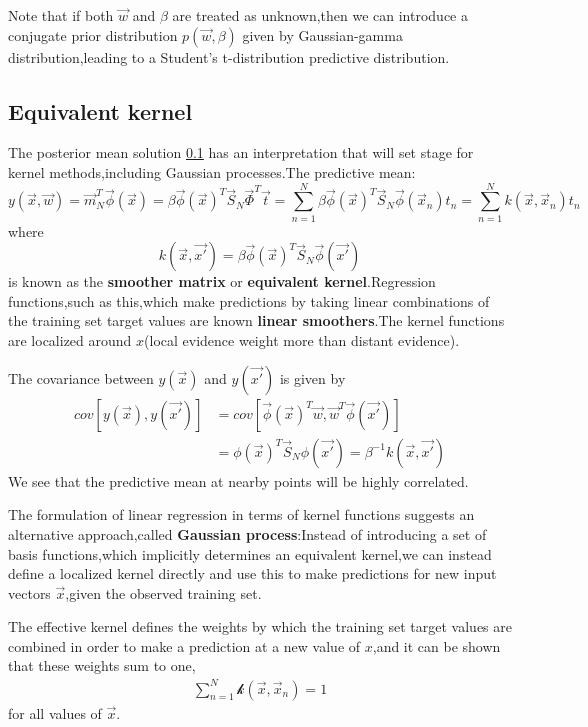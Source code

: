Note that if both $\vec{w}$ and $\beta$ are treated as unknown,then we can introduce a conjugate prior distribution $p(\vec{w},\beta)$ given by Gaussian-gamma distribution,leading to a Student's t-distribution predictive distribution.

\subsection{Equivalent kernel}
The posterior mean solution \ref{} has an interpretation that will set stage for kernel methods,including Gaussian processes.The predictive mean:
\begin{equation}
y(\vec{x},\vec{w})=\vec{m}_N^T\vec{\phi}(\vec{x})
=\beta\vec{\phi}(\vec{x})^T\vec{S}_N\vec{\Phi}^T\vec{t}
=\sum_{n=1}^{N}\beta\vec{\phi}(\vec{x})^T\vec{S}_N\vec{\phi}(\vec{x}_n)t_n
=\sum_{n=1}^{N}\mathit{k}(\vec{x},\vec{x}_n)t_n
\end{equation}
where
\begin{equation}
k(\vec{x},\vec{x'})
=\beta\vec{\phi}(\vec{x})^T\vec{S}_N\vec{\phi}(\vec{x'})
\end{equation}
is known as the \textbf{smoother matrix} or \textbf{equivalent kernel}.Regression functions,such as this,which make predictions by taking linear combinations of the training set target values are known \textbf{linear smoothers}.The kernel functions are localized around $x$(local evidence weight more than distant evidence).

The covariance between $y(\vec{x})$ and $y(\vec{x'})$ is given by
\begin{align}
cov[y(\vec{x}),y(\vec{x'})] &=cov[\vec{\phi}(\vec{x})^T\vec{w},\vec{w}^T\vec{\phi}(\vec{x'})] \\
&=\phi(\vec{x})^T\vec{S}_N\phi(\vec{x'})=\beta^{-1}\mathit{k}(\vec{x},\vec{x'})
\end{align}
We see that the predictive mean at nearby points will be highly correlated.

The formulation of linear regression in terms of kernel functions suggests an alternative approach,called \textbf{Gaussian process}:Instead of introducing a set of basis functions,which implicitly determines an equivalent kernel,we can instead define a localized kernel directly and use this to make predictions for new input vectors $\vec{x}$,given the observed training set.

The effective kernel defines the weights by which the training set target values are combined in order to make a prediction at a new value of $x$,and it can be shown that these weights sum to one,
\begin{align}
\sum\limits_{n=1}^{N}\mathcal{k}(\vec{x},\vec{x}_n) = 1
\end{align}
for all values of $\vec{x}$.

